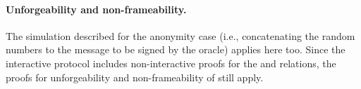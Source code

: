 \paragraph{Unforgeability and non-frameability.} The simulation described for
the anonymity case (i.e., \advB concatenating the random numbers
to the message to be signed by the oracle) applies here too. Since the
interactive protocol includes non-interactive proofs for the \RelSig
and \RelIns relations, the proofs for unforgeability and
non-frameability of \CUASGen still apply.

